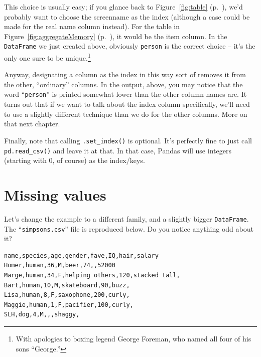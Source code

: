 
This choice is usually easy; if you glance back to Figure~\ref{fig:table}
(p.~\pageref{fig:table}), we'd probably want to choose the \textsf{screenname}
as the index (although a case could be made for the \textsf{real name} column
instead). For the table in Figure~\ref{fig:aggregateMemory}
(p.~\pageref{fig:aggregateMemory}), it would be the \textsf{item} column. In
the \texttt{DataFrame} we just created above, obviously \texttt{person} is the
correct choice -- it's the only one sure to be unique.\footnote{With apologies
to boxing legend George Foreman, who named all four of his sons ``George.''}

Anyway, designating a column as the index in this way sort of removes it from
the other, ``ordinary'' columns. In the output, above, you may notice that the
word ``\texttt{person}'' is printed somewhat lower than the other column names
are. It turns out that if we want to talk about the index column specifically,
we'll need to use a slightly different technique than we do for the other
columns. More on that next chapter.

Finally, note that calling \texttt{.set\_index()} is optional. It's perfectly
fine to just call \texttt{pd.read\_csv()} and leave it at that. In that case,
Pandas will use integers (starting with 0, of course) as the index/keys.

\section{Missing values}

Let's change the example to a different family, and a slightly bigger
\texttt{DataFrame}. The ``\texttt{simpsons.csv}'' file is reproduced below. Do
you notice anything odd about it?


\vspace{-.15in}
\begin{Verbatim}[fontsize=\small,samepage=true,frame=lines,framesep=3mm]
name,species,age,gender,fave,IQ,hair,salary
Homer,human,36,M,beer,74,,52000
Marge,human,34,F,helping others,120,stacked tall,
Bart,human,10,M,skateboard,90,buzz,
Lisa,human,8,F,saxophone,200,curly,
Maggie,human,1,F,pacifier,100,curly,
SLH,dog,4,M,,,shaggy,
\end{Verbatim}
\vspace{-.15in}

